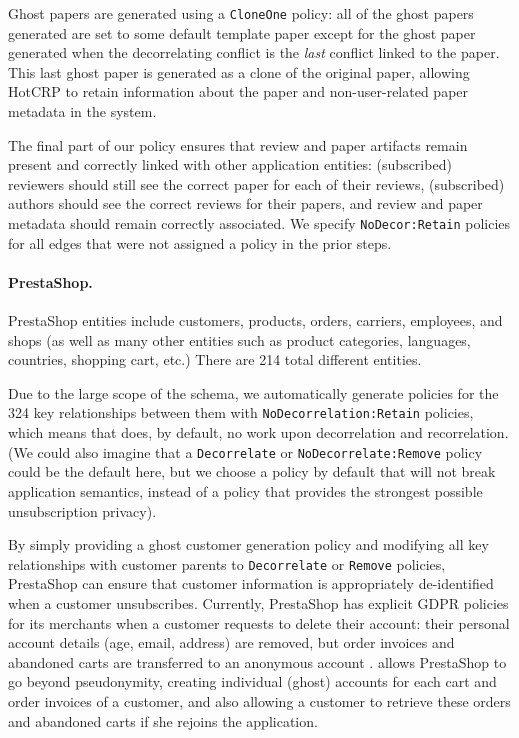 Ghost papers are generated using a \texttt{CloneOne} policy: all of the ghost papers generated are
set to some default template paper except for the ghost paper generated when the decorrelating
conflict is the \emph{last} conflict linked to the paper. This last ghost paper is generated as a
clone of the original paper, allowing HotCRP to retain information about the paper and
non-user-related paper metadata in the system.

The final part of our policy ensures that review and paper artifacts remain present and
correctly linked with other application entities: (subscribed) reviewers should still see the correct paper for each of
their reviews, (subscribed) authors should see the correct reviews for their papers, and review and
paper metadata should remain correctly associated. We specify
\texttt{NoDecor:Retain} policies for all edges that were not assigned a policy in the prior
steps.

\paragraph{PrestaShop.} 
PrestaShop entities include customers, products, orders, carriers, employees, and shops (as well as
many other entities such as product categories, languages, countries, shopping cart, etc.) There are
214 total different entities. 

Due to the large scope of the schema, we automatically generate policies for the 324 key relationships between them 
with \texttt{NoDecorrelation:Retain} policies, which means that \sys does, by default, no work upon
decorrelation and recorrelation. (We could also imagine that a \texttt{Decorrelate} or
\texttt{NoDecorrelate:Remove} policy could be
the default here, but we choose a policy by default that will not break application semantics,
instead of a policy that provides the strongest possible unsubscription privacy).

By simply providing a ghost customer generation policy and modifying all key relationships with
customer parents to \texttt{Decorrelate} or \texttt{Remove} policies, PrestaShop can ensure that
customer information is appropriately de-identified when a customer unsubscribes.
Currently, PrestaShop has explicit GDPR policies for its merchants when a customer requests to delete
their account: their personal account details (age, email, address) are removed, but order invoices
and abandoned carts are transferred to an anonymous account
.
\sys allows PrestaShop to go beyond pseudonymity, creating individual (ghost) accounts for each
cart and order invoices of a customer, and also allowing a customer to retrieve these orders and
abandoned carts if she rejoins the application.

